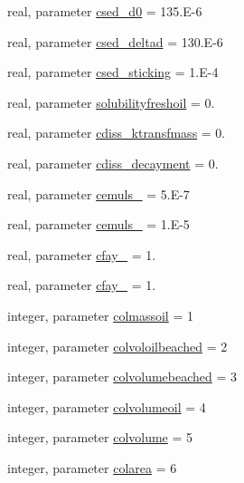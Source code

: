\begin{DoxyCompactItemize}
\item 
real, parameter \mbox{\hyperlink{namespacemoduleoil_aa8fc0a736aaeb89fe85f27d92b6700f5}{csed\+\_\+d0}} = 135.\+E-\/6
\item 
real, parameter \mbox{\hyperlink{namespacemoduleoil_a42957e6ffc6b29b2df9f369b5de99ac0}{csed\+\_\+deltad}} = 130.\+E-\/6
\item 
real, parameter \mbox{\hyperlink{namespacemoduleoil_a0be30fe03f8b242de5ca3172e8c7014c}{csed\+\_\+sticking}} = 1.\+E-\/4
\item 
real, parameter \mbox{\hyperlink{namespacemoduleoil_a87308e17b6b42f0df4a04bbfbe791a84}{solubilityfreshoil}} = 0.
\item 
real, parameter \mbox{\hyperlink{namespacemoduleoil_a43202f3556eded5c151df73d098477c6}{cdiss\+\_\+ktransfmass}} = 0.
\item 
real, parameter \mbox{\hyperlink{namespacemoduleoil_aa9c81e28b328f76962efa72af32162f9}{cdiss\+\_\+decayment}} = 0.
\item 
real, parameter \mbox{\hyperlink{namespacemoduleoil_ac1fb44ad8e24ebba2cdf05bac6d1351e}{cemuls\+\_}} = 5.\+E-\/7
\item 
real, parameter \mbox{\hyperlink{namespacemoduleoil_a36f8acd949415f908de4279b101905ce}{cemuls\+\_}} = 1.\+E-\/5
\item 
real, parameter \mbox{\hyperlink{namespacemoduleoil_a8e5cd4a6280206c46ff2a18cd101b8ff}{cfay\+\_}} = 1.
\item 
real, parameter \mbox{\hyperlink{namespacemoduleoil_a9023ee9f1ee5e3bbd3ef73b0fc3ad25b}{cfay\+\_}} = 1.
\item 
integer, parameter \mbox{\hyperlink{namespacemoduleoil_ae298702c324458a69504cb168fbc09c8}{colmassoil}} = 1
\item 
integer, parameter \mbox{\hyperlink{namespacemoduleoil_aa67a0e7842c42e4504c82fd7f85324c0}{colvoloilbeached}} = 2
\item 
integer, parameter \mbox{\hyperlink{namespacemoduleoil_af255dead494f9fb2acaf47a4d0dec9d4}{colvolumebeached}} = 3
\item 
integer, parameter \mbox{\hyperlink{namespacemoduleoil_a585198a23d58889aa724511f30843dff}{colvolumeoil}} = 4
\item 
integer, parameter \mbox{\hyperlink{namespacemoduleoil_a0329e06a783575a6ee4822170244d824}{colvolume}} = 5
\item 
integer, parameter \mbox{\hyperlink{namespacemoduleoil_ab1a2f215806040cbb2c3a4a06fc653cd}{colarea}} = 6
\item 

\end{DoxyCompactItemize}
